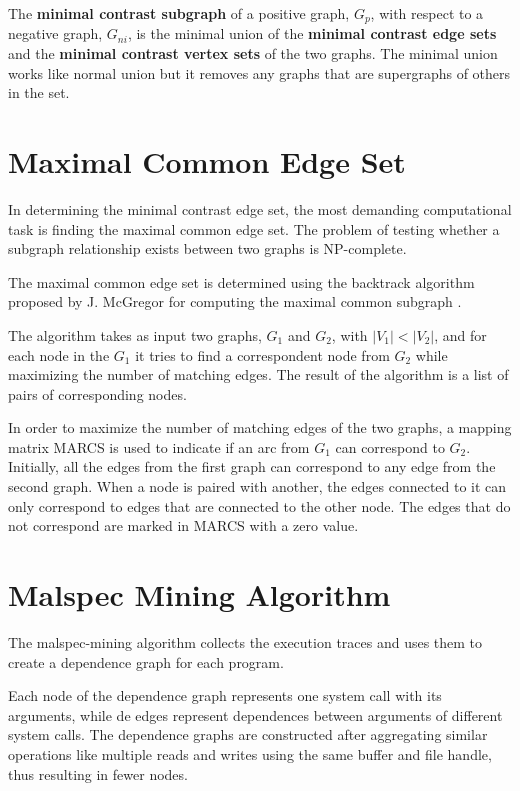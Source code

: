 The \textbf{minimal contrast subgraph} of a positive graph, $G_{p}$, with respect to a negative graph, $G_{ni}$, is the minimal union of the \textbf{minimal contrast edge sets} and the \textbf{minimal contrast vertex sets} of the two graphs. The minimal union works like normal union but it removes any graphs that are supergraphs of others in the set.

\section{Maximal Common Edge Set}
\label{third:maximal-common-edge-set}

In determining the minimal contrast edge set, the most demanding computational task is finding the maximal common edge set. The problem of testing whether a subgraph relationship exists between two graphs is NP-complete.

The maximal common edge set is determined using the backtrack algorithm proposed by J. McGregor for computing the maximal common subgraph \cite{common-subgraph}. 

The algorithm takes as input two graphs, $G_{1}$ and $G_{2}$, with $|V_{1}| < |V_{2}|$, and for each node in the $G_{1}$ it tries to find a correspondent node from $G_{2}$ while maximizing the number of matching edges. The result of the algorithm is a list of pairs of corresponding nodes.

In order to maximize the number of matching edges of the two graphs, a mapping matrix MARCS is used to indicate if an arc from $G_{1}$ can correspond to $G_{2}$. Initially, all the edges from the first graph can correspond to any edge from the second graph. When a node is paired with another, the edges connected to it can only correspond to edges that are connected to the other node. The edges that do not correspond are marked in MARCS with a zero value.

\section{Malspec Mining Algorithm}
\label{third:malspec-algorithm}	

The malspec-mining algorithm collects the execution traces and uses them to create a dependence graph for each program.

Each node of the dependence graph represents one system call with its arguments, while de edges represent dependences between arguments of different system calls. The dependence graphs are constructed after aggregating similar operations like multiple reads and writes using the same buffer and file handle, thus resulting in fewer nodes.

